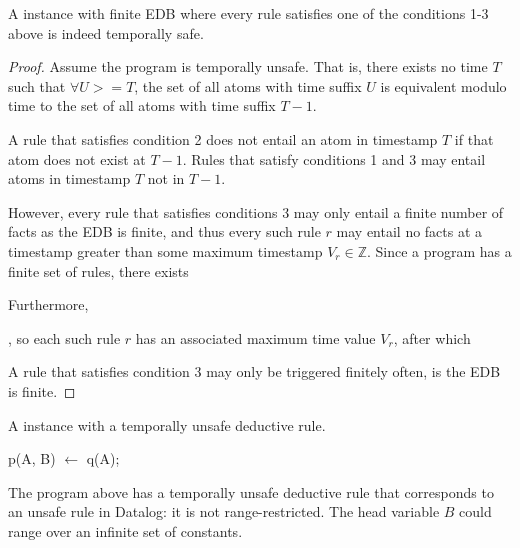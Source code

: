 \begin{lemma} 
%
A \slang instance with finite EDB where every rule satisfies one of the
conditions 1-3 above is indeed temporally safe.
%
\end{lemma}
%
\begin{proof}
%
Assume the program is temporally unsafe.  That is, there exists no time $T$
such that $\forall U >= T$, the set of all atoms with time suffix $U$ is
equivalent modulo time to the set of all atoms with time suffix $T-1$.

A rule that satisfies condition 2 does not entail an atom in timestamp $T$ if
that atom does not exist at $T-1$.  Rules that satisfy conditions 1 and 3
may entail atoms in timestamp $T$ not in $T-1$.

However, every rule that satisfies conditions 3 may only entail a finite number
of facts as the EDB is finite, and thus every such rule $r$ may entail no facts
at a timestamp greater than some maximum timestamp $V_r \in \mathbb{Z}$.  Since
a \slang program has a finite set of rules, there exists 

Furthermore,


, so each such rule
$r$ has an associated maximum time value $V_r$, after which 

A rule that satisfies condition 3
may only be triggered finitely often, is the EDB is finite.  

%
\end{proof}

\begin{example}
A \slang instance with a temporally unsafe deductive rule.

\begin{Dedalus}
p(A, B) \(\leftarrow\) q(A);
\end{Dedalus}

The program above has a temporally unsafe deductive rule that corresponds to an
unsafe rule in Datalog: it is not range-restricted.  The head variable $B$
could range over an infinite set of constants.
\end{example}


